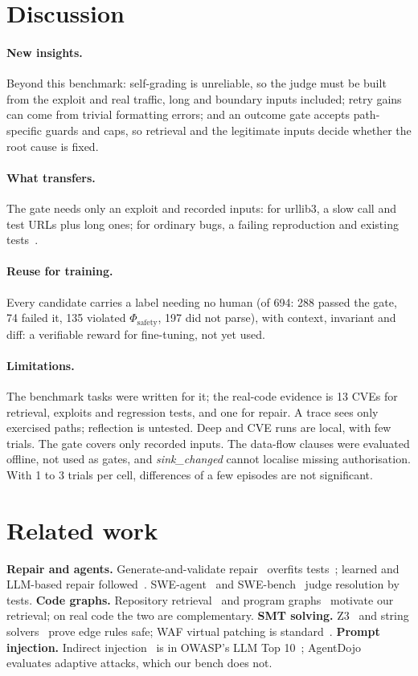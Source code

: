 \documentclass[10pt,a4paper]{article}
\newcommand{\phisafe}{\ensuremath{\Phi_{\mathrm{safety}}}}
\begin{document}
\section{Discussion}\label{sec:disc}

\paragraph{New insights.} Beyond this benchmark: self-grading is unreliable, so the judge must be built from the exploit and real traffic, long and boundary inputs included; retry gains can come from trivial formatting errors; and an outcome gate accepts path-specific guards and caps, so retrieval and the legitimate inputs decide whether the root cause is fixed.

\paragraph{What transfers.} The gate needs only an exploit and recorded inputs: for urllib3, a slow call and test URLs plus long ones; for ordinary bugs, a failing reproduction and existing tests~\cite{swebench}.

\paragraph{Reuse for training.} Every candidate carries a label needing no human (of 694: 288 passed the gate, 74 failed it, 135 violated \phisafe{}, 197 did not parse), with context, invariant and diff: a verifiable reward for fine-tuning, not yet used.

\paragraph{Limitations.} The benchmark tasks were written for it; the real-code evidence is 13 CVEs for retrieval, exploits and regression tests, and one for repair. A trace sees only exercised paths; reflection is untested. Deep and CVE runs are local, with few trials. The gate covers only recorded inputs. The data-flow clauses were evaluated offline, not used as gates, and \emph{sink\_changed} cannot localise missing authorisation. With 1 to 3 trials per cell, differences of a few episodes are not significant.

\section{Related work}
\textbf{Repair and agents.} Generate-and-validate repair~\cite{genprog,monperrus} overfits tests~\cite{overfit}; learned and LLM-based repair followed~\cite{getafix,alpharepair}. SWE-agent~\cite{sweagent} and SWE-bench~\cite{swebench} judge resolution by tests. \textbf{Code graphs.} Repository retrieval~\cite{repocoder} and program graphs~\cite{allamanis} motivate our retrieval; on real code the two are complementary. \textbf{SMT solving.} Z3~\cite{z3} and string solvers~\cite{z3str3} prove edge rules safe; WAF virtual patching is standard~\cite{crs}. \textbf{Prompt injection.} Indirect injection~\cite{greshake} is in OWASP's LLM Top 10~\cite{owasp}; AgentDojo~\cite{agentdojo} evaluates adaptive attacks, which our bench does not.
\end{document}
